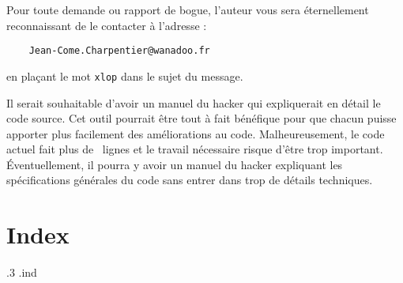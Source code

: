 \documentclass[12pt]{report}
\begin{document}
Pour toute demande ou rapport de bogue, l'auteur vous sera
éternellement reconnaissant de le contacter à l'adresse :
\begin{verbatim}
    Jean-Come.Charpentier@wanadoo.fr
\end{verbatim}
en plaçant le mot \og \texttt{xlop} \fg{} dans le sujet du message.

Il serait souhaitable d'avoir un manuel du hacker qui expliquerait en
détail le code source. Cet outil pourrait être tout à fait bénéfique
pour que chacun puisse apporter plus facilement des améliorations au
code. Malheureusement, le code actuel fait plus de~
lignes et le travail nécessaire risque d'être trop important.
Éventuellement, il pourra y avoir un manuel du hacker expliquant les
spécifications générales du code sans entrer dans trop de détails
techniques.

\chapter{Index}
\label{chap:index}
\begin{multicols}{2}
\makeatletter
\parindent \z@\relax
\parskip \z@ \@plus.3\p@\relax
\let\item\@idxitem
\makeatother
\renewenvironment{theindex}{}{}%
\jobname.ind
\end{multicols}
\end{document}
